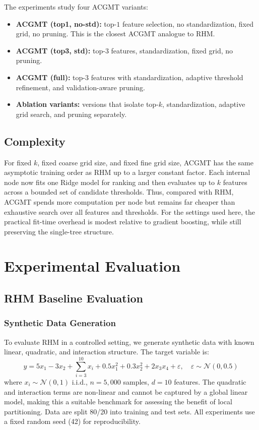 \documentclass[11pt,a4paper]{article}
\begin{document}
The experiments study four ACGMT variants:
\begin{itemize}
    \item \textbf{ACGMT (top1, no-std):} top-$1$ feature selection, no standardization, fixed grid, no pruning. This is the closest ACGMT analogue to RHM.
    \item \textbf{ACGMT (top3, std):} top-$3$ features, standardization, fixed grid, no pruning.
    \item \textbf{ACGMT (full):} top-$3$ features with standardization,
    adaptive threshold refinement, and validation-aware pruning.
    \item \textbf{Ablation variants:} versions that isolate top-$k$, standardization, adaptive grid search, and pruning separately.
\end{itemize}

\subsection{Complexity}

For fixed $k$, fixed coarse grid size, and fixed fine grid size, ACGMT has the same asymptotic training order as RHM up to a larger constant factor. Each internal node now fits one Ridge model for ranking and then evaluates up to $k$ features across a bounded set of candidate thresholds. Thus, compared with RHM, ACGMT spends more computation per node but remains far cheaper than exhaustive search over all features and thresholds. For the settings used here, the practical fit-time overhead is modest relative to gradient boosting, while still preserving the single-tree structure.

\section{Experimental Evaluation}\label{sec:experiments}

\subsection{RHM Baseline Evaluation}

\subsubsection{Synthetic Data Generation}

To evaluate RHM in a controlled setting, we generate synthetic data with known linear, quadratic, and interaction structure. The target variable is:
\[
    y = 5x_1 - 3x_2 + \sum_{i=3}^{10} x_i + 0.5x_1^2 + 0.3x_2^2 + 2x_3 x_4 + \varepsilon, \quad \varepsilon \sim \mathcal{N}(0, 0.5)
\]
where $x_i \sim \mathcal{N}(0, 1)$ i.i.d., $n = 5{,}000$ samples, $d = 10$ features. The quadratic and interaction terms are non-linear and cannot be captured by a global linear model, making this a suitable benchmark for assessing the benefit of local partitioning. Data are split 80/20 into training and test sets. All experiments use a fixed random seed (42) for reproducibility.
\end{document}
